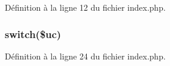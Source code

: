 Définition à la ligne 12 du fichier index.\+php.

\subsubsection[{\texorpdfstring{switch}{switch}}]{\setlength{\rightskip}{0pt plus 5cm}switch(\$uc)}\hypertarget{index_8php_a6160ae6d9a60bbcc19780fa9bc2c9b41}{}\label{index_8php_a6160ae6d9a60bbcc19780fa9bc2c9b41}


Définition à la ligne 24 du fichier index.\+php.

